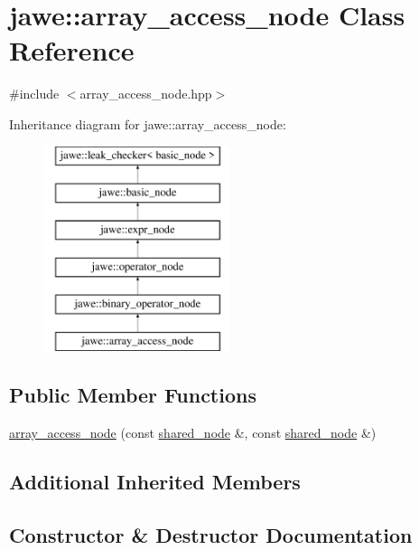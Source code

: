 \hypertarget{classjawe_1_1array__access__node}{}\section{jawe\+:\+:array\+\_\+access\+\_\+node Class Reference}
\label{classjawe_1_1array__access__node}


{\ttfamily \#include $<$array\+\_\+access\+\_\+node.\+hpp$>$}

Inheritance diagram for jawe\+:\+:array\+\_\+access\+\_\+node\+:\begin{figure}[H]
\begin{center}
\leavevmode
\includegraphics[height=6.000000cm]{classjawe_1_1array__access__node}
\end{center}
\end{figure}
\subsection*{Public Member Functions}
\begin{DoxyCompactItemize}
\item 
\hyperlink{classjawe_1_1array__access__node_a2befd67464439d2f94ee7469f41c5c1c}{array\+\_\+access\+\_\+node} (const \hyperlink{namespacejawe_a3f307481d921b6cbb50cc8511fc2b544}{shared\+\_\+node} \&, const \hyperlink{namespacejawe_a3f307481d921b6cbb50cc8511fc2b544}{shared\+\_\+node} \&)
\end{DoxyCompactItemize}
\subsection*{Additional Inherited Members}


\subsection{Constructor \& Destructor Documentation}
\mbox{\label{classjawe_1_1array__access__node_a2befd67464439d2f94ee7469f41c5c1c}} 
